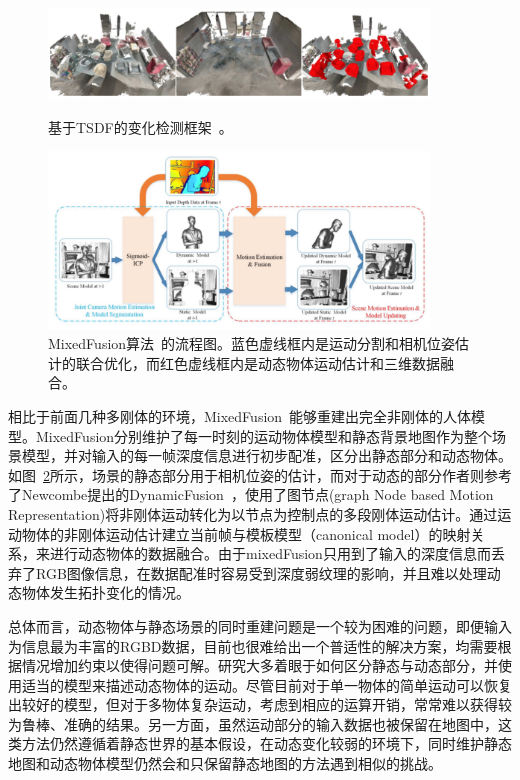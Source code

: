 \begin{figure}[htbp]
	\centering
	\includegraphics[width=0.9\textwidth]{figs/2-3/tsdf2.jpeg}
	\label{fig:Change-Detection-Overview}
	\caption{基于TSDF的变化检测框架~\cite{Fehr2017TSDF}。}
\end{figure}

\begin{figure}[thbp]
	\centering
	\includegraphics[width=0.9\textwidth]{figs/2-2/mixedFusion.jpeg} 
	\caption{MixedFusion算法~\cite{2017MixedFusion}的流程图。蓝色虚线框内是运动分割和相机位姿估计的联合优化，而红色虚线框内是动态物体运动估计和三维数据融合。}
	\label{fig:mixedFusion-framework}
\end{figure}

相比于前面几种多刚体的环境，MixedFusion~\cite{2017MixedFusion}能够重建出完全非刚体的人体模型。MixedFusion分别维护了每一时刻的运动物体模型和静态背景地图作为整个场景模型，并对输入的每一帧深度信息进行初步配准，区分出静态部分和动态物体。如图~\ref{fig:mixedFusion-framework}所示，场景的静态部分用于相机位姿的估计，而对于动态的部分作者则参考了Newcombe提出的DynamicFusion~\cite{2015DynamicFusion}，使用了图节点(graph Node based Motion Representation)将非刚体运动转化为以节点为控制点的多段刚体运动估计。通过运动物体的非刚体运动估计建立当前帧与模板模型（canonical model）的映射关系，来进行动态物体的数据融合。由于mixedFusion只用到了输入的深度信息而丢弃了RGB图像信息，在数据配准时容易受到深度弱纹理的影响，并且难以处理动态物体发生拓扑变化的情况。

总体而言，动态物体与静态场景的同时重建问题是一个较为困难的问题，即便输入为信息最为丰富的RGBD数据，目前也很难给出一个普适性的解决方案，均需要根据情况增加约束以使得问题可解。研究大多着眼于如何区分静态与动态部分，并使用适当的模型来描述动态物体的运动。尽管目前对于单一物体的简单运动可以恢复出较好的模型，但对于多物体复杂运动，考虑到相应的运算开销，常常难以获得较为鲁棒、准确的结果。另一方面，虽然运动部分的输入数据也被保留在地图中，这类方法仍然遵循着静态世界的基本假设，在动态变化较弱的环境下，同时维护静态地图和动态物体模型仍然会和只保留静态地图的方法遇到相似的挑战。

